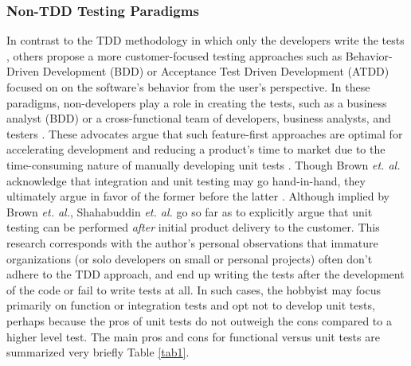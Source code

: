 \subsubsection{Non-TDD Testing Paradigms}\label{sec:intro-}
In contrast to the TDD methodology in which only the developers write the tests
\cite{axelrod2018unit}, 
others \cite{brown2013agility, shahabuddin2016integration, moe2019comparative} propose a 
more customer-focused testing approaches such as Behavior-Driven Development (BDD)
or Acceptance Test Driven Development (ATDD) focused on on the software's behavior 
from the user's perspective. In these paradigms, non-developers play a role 
in creating the tests, such as a business analyst (BDD) \cite{barus2019implementation}
or a cross-functional team of developers, business analysts, and testers \cite{pugh2010lean}.
These advocates argue that such feature-first approaches are optimal for accelerating development 
and reducing a product's time to market due to the time-consuming nature of manually
developing unit tests \cite{kahur2023java, shahabuddin2016integration}.
Though Brown \textit{et. al.} acknowledge that integration and unit
testing may go hand-in-hand, they 
ultimately argue in favor of the former before the latter \cite{brown2013agility}.  
Although implied by Brown \textit{et. al.}, Shahabuddin \textit{et. al.} 
\cite{shahabuddin2016integration} go so far as to explicitly argue that unit
testing can be performed \textit{after} initial product delivery to the customer.
%
This research corresponds with the author’s personal observations that immature 
organizations (or solo developers on small or personal projects)
often don’t adhere to the  TDD approach, and end up writing the tests 
after the development of the code or fail to write tests at all. In such cases,
the hobbyist may focus primarily on function or integration tests
and opt not to develop unit tests, perhaps because the pros of unit tests
do not outweigh the cons compared to a higher level test.
%
The main pros and cons for functional versus unit tests are summarized very 
briefly Table \ref{tab1}.

